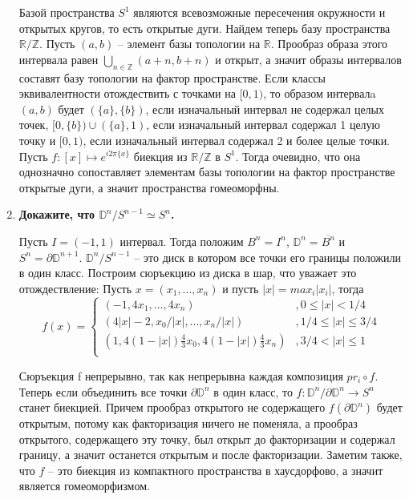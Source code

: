 \documentclass{article}
\begin{document}
\begin{enumerate}
        Базой пространства $S^1$ являются всевозможные пересечения окружности
        и открытых кругов, то есть открытые дуги. Найдем теперь базу
        пространства $\mathbb{R}/\mathbb{Z}$. Пусть $(a,b)$ – элемент базы
        топологии на $\mathbb{R}$. Прообраз образа этого интервала равен
        $\bigcup_{n\in\mathbb{Z}}(a+n,b+n)$ и открыт, а значит образы
        интервалов составят базу топологии на фактор пространстве. Если классы
        эквивалентности отождествить с точками на $[0,1)$, то образом
        интервалa $(a,b)$ будет $(\{a\},\{b\})$, если изначальный интервал не
        содержал целых точек, $[0,\{b\})\cup(\{a\},1)$, если изначальный
        интервал содержал 1 целую точку и $[0,1)$, если изначальный интервал
        содержал 2 и более целые точки. Пусть $f:[x]\mapsto e^{i2\pi\{x\}}$
        биекция из $\mathbb{R}/\mathbb{Z}$ в $S^1$. Тогда очевидно, что она
        однозначно сопоставляет элементам базы топологии на фактор пространстве
        открытые дуги, а значит пространства гомеоморфны.

    \item \textbf{Докажите, что $\mathbb{D}^n/S^{n−1}\simeq S^n$.}\par

        Пусть $I=(-1,1)$ интервал. Тогда положим $B^n=I^n$, $\mathbb{D}^n=
        \overline{B^n}$ и $S^n=\partial\mathbb{D}^{n+1}$. $\mathbb{D}^n/S^{n-1}$ –
        это диск в котором все точки его границы положили в один класс.
        Построим сюръекцию из диска в шар, что уважает это отождествление:
        Пусть $x=(x_1,...,x_n)$ и пусть $|x|=max_i|x_i|$, тогда
        \[f(x)=
        \begin{cases}
            (-1,4x_1,...,4x_n) &,0\leqslant|x|<1/4\\
            (4|x|-2,x_0/|x|,...,x_n/|x|) &,1/4\leqslant|x|\leqslant 3/4\\
            (1,4(1-|x|)\frac{4}{3}x_0,4(1-|x|)\frac{4}{3}x_n) &,3/4<|x|\leqslant1\\
        \end{cases}\]

        Сюръекция f непрерывно, так как непрерывна каждая композиция $pr_i
        \circ f$. Теперь если объединить все точки $\partial\mathbb{D}^n$ в
        один класс, то $f:\mathbb{D}^n/\partial\mathbb{D}^n\longrightarrow S^n$
        станет биекцией. Причем прообраз открытого не содержащего $f(\partial
        \mathbb{D}^n)$ будет открытым, потому как факторизация ничего не
        поменяла, а прообраз открытого, содержащего эту точку, был открыт до
        факторизации и содержал границу, а значит останется открытым и после
        факторизации. Заметим также, что $f$ – это биекция из компактного
        пространства в хаусдорфово, а значит является гомеоморфизмом.


\end{enumerate}
\end{document}
